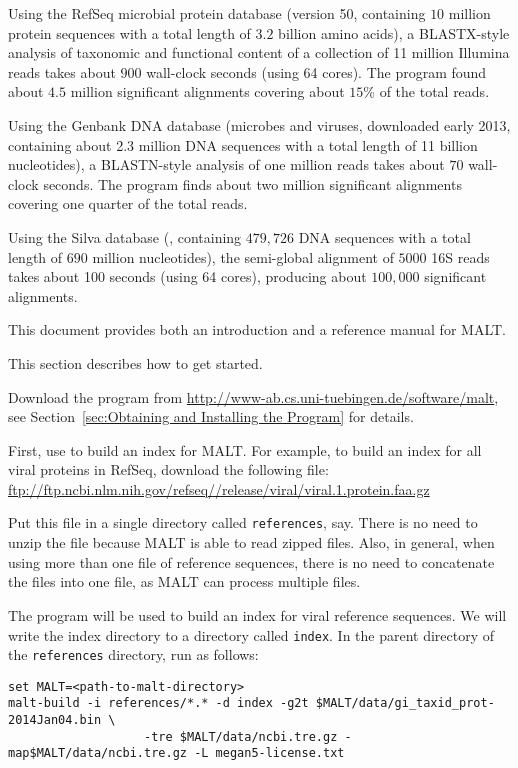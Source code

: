 \documentclass[11pt]{article}
\newcommand\MALT{{\sf MALT}\xspace}
\begin{document}
\begin{enumerate}
\item
Using the RefSeq microbial protein database (version 50, containing $10$ million protein sequences with a total length of $3.2$ billion amino acids), a BLASTX-style analysis of taxonomic and functional content of
a collection of 11 million Illumina reads takes about $900$ wall-clock seconds (using 64 cores).
The program found about $4.5$ million significant alignments covering about $15$\% of the total reads.
{
\item Using the Genbank DNA database (microbes and viruses,
downloaded early 2013, containing about 2.3 million DNA sequences with a total length of 
11 billion nucleotides), a BLASTN-style analysis of one million reads takes about $70$ wall-clock seconds. 
The program finds about two million  significant alignments covering one quarter of the total reads.
\item Using the Silva database (, containing $479,726$ DNA sequences with a total length of  $690$ million nucleotides), the semi-global alignment of $5000$ 16S reads takes about 100 seconds (using 64 cores), producing
about $100,000$ significant alignments. 
}
\end{enumerate}

This document provides both an introduction and a reference manual for \MALT.

\pagebreak

This section describes how to get started.

Download the program from \url{http://www-ab.cs.uni-tuebingen.de/software/malt},
see Section~\ref{sec:Obtaining and Installing the Program}
for details.


First, use  to build an index for \MALT. For example,
to build an index for all viral proteins in RefSeq, download the following file:
\url{ftp://ftp.ncbi.nlm.nih.gov/refseq//release/viral/viral.1.protein.faa.gz}


Put this file in a single directory called {\tt references}, say. There is no need to unzip the file
because \MALT is able to read zipped files. Also, in general, when using more than one file of reference sequences,
there is no need to concatenate the files into one file, as \MALT can process multiple files.

The program  will be used to build an index for viral reference sequences. We will write the index
directory to a directory called {\tt index}.
In the parent directory of the {\tt references} directory, run  as follows:
{\footnotesize
\begin{verbatim}
set MALT=<path-to-malt-directory>
malt-build -i references/*.* -d index -g2t $MALT/data/gi_taxid_prot-2014Jan04.bin \
                   -tre $MALT/data/ncbi.tre.gz -map$MALT/data/ncbi.tre.gz -L megan5-license.txt
\end{verbatim}
}
\end{document}
